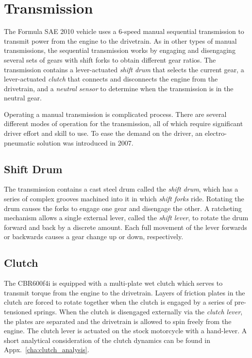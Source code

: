 \section{Transmission\label{sec:background_transmission}}

The Formula SAE 2010 vehicle uses a 6-speed manual sequential transmission to transmit power from the engine to the drivetrain. As in other types of manual transmissions, the sequential transmission works by engaging and disengaging several sets of gears with shift forks to obtain different gear ratios. The transmission contains a lever-actuated \emph{shift drum} that selects the current gear, a lever-actuated \emph{clutch} that connects and disconnects the engine from the drivetrain, and a \emph{neutral sensor} to determine when the transmission is in the neutral gear. 

Operating a manual transmission is complicated process. There are several different modes of operation for the transmission, all of which require significant driver effort and skill to use. To ease the demand on the driver, an electro-pneumatic solution was introduced in 2007.

\subsection{Shift Drum}
\label{sec:background_trans_shiftdrum}

The transmission contains a cast steel drum called the \emph{shift drum}, which has a series of complex grooves machined into it in which \emph{shift forks} ride. Rotating the drum causes the forks to engage one gear and disengage the other. A ratcheting mechanism allows a single external lever, called the \emph{shift lever}, to rotate the drum forward and back by a discrete amount. Each full movement of the lever forwards or backwards causes a gear change up or down, respectively.

\subsection{Clutch}

The CBR600f4i is equipped with a multi-plate wet clutch which serves to transmit torque from the engine to the drivetrain. Layers of friction plates in the clutch are forced to rotate together when the clutch is engaged by a series of pre-tensioned springs. When the clutch is disengaged externally via the \emph{clutch lever}, the plates are separated and the drivetrain is allowed to spin freely from the engine. The clutch lever is actuated on the stock motorcycle with a hand-lever. A short analytical consideration of the clutch dynamics can be found in Appx.\ \ref{cha:clutch_analysis}.

